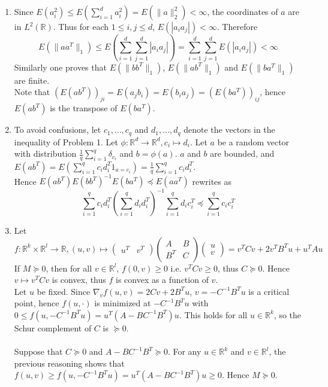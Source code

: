 \documentclass[a4paper,11pt]{article}
\begin{document}
\begin{enumerate}
  \item Since $E(a_i^2) \leq E(\sum_{i=1}^d a_i^2) = E(\|a\|_2^2) < \infty$, the coordinates of $a$ are in $L^2(\mathbb R)$. Thus for each $1\leq i,j\leq d$, $E(|a_i a_j|)<\infty$. Therefore $$E(\|aa^T\|_1) \leq E\left(\sum_{i=1}^d \sum_{j=1}^d |a_i a_j| \right) = \sum_{i=1}^d \sum_{j=1}^d E(|a_i a_j|)<\infty$$
  Similarly one proves that $E(\|bb^T\|_1)$, $E(\|ab^T\|_1)$ and $E(\|ba^T\|_1)$ are finite.\\
  Note that $(E(ab^T))_{ji} = E(a_j b_i) = E(b_ia_j) = (E(ba^T))_{ij}$, hence $E(ab^T)$ is the transpose of $E(ba^T)$.

  \item To avoid confusions, let $c_1,\ldots, c_q$ and $d_1,\ldots, d_q$ denote the vectors in the inequality of Problem 1. Let $\phi: \mathbb R^d\to \mathbb R^d, c_i \mapsto d_i$. Let $a$ be a random vector with distribution $\frac 1q \sum_{i=1}^q \delta_{c_i}$ and $b=\phi(a)$. $a$ and $b$ are bounded, and $E(ab^T) = E\left(\sum_{i=1}^q c_i d_i^T 1_{a=c_i}\right) = \frac 1q \sum_{i=1}^q  c_i d_i^T$.\\
  Hence $E(ab^T) E(bb^T)^{-1} E(ba^T) \preceq E(aa^T)$ rewrites as 
  $$\sum_{i=1}^q c_i d_i^T \left(\sum_{i=1}^q d_i d_i^T\right)^{-1} \sum_{i=1}^q d_i c_i^T \preceq \sum_{i=1}^q c_i c_i^T$$

  \item Let $f:\mathbb R^k\times \mathbb R^l\to \mathbb R, (u,v)\mapsto \begin{pmatrix}u^T & v^T \end{pmatrix} \begin{pmatrix}
        A & B \\
        B^T & C\end{pmatrix} \begin{pmatrix}u \\ v \end{pmatrix} = v^TCv + 2v^TB^Tu + u^TAu$\\
  If $M\succeq 0$, then for all $v\in \mathbb R^l$, $f(0,v)\geq 0$ i.e. $v^TCv \geq 0$, thus $C\succeq 0$.
  Hence $v\mapsto v^TCv$ is convex, thus $f$ is convex as a function of $v$.\\
  Let $u$ be fixed. Since $\nabla_v f(u,v) = 2Cv + 2B^Tu$, $v=-C^{-1}B^Tu$ is a critical point, hence $f(u,\cdot)$ is minimized at $-C^{-1}B^Tu$ with $0\leq f(u,-C^{-1}B^Tu) = u^T(A-BC^{-1}B^T)u$. This holds for all $u\in \mathbb R^k$, so the Schur complement of $C$ is $\succeq 0$.\\
  \\
  Suppose that $C\succeq 0$ and $A-BC^{-1}B^T\succeq 0$. For any $u\in \mathbb R^k$ and $v\in \mathbb R^l$, the previous reasoning shows that $f(u,v)\geq f(u,-C^{-1}B^Tu) = u^T(A-BC^{-1}B^T)u \geq 0$. Hence $M\succeq 0$.


\end{enumerate}
\end{document}

